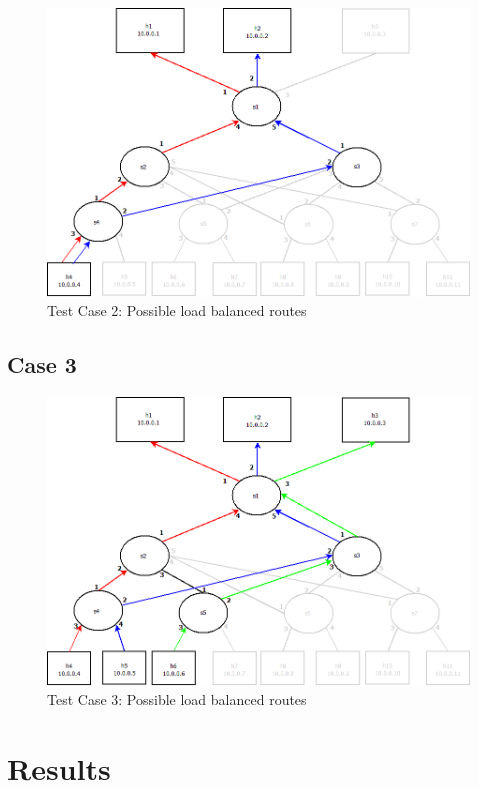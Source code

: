 \begin{figure}[h!]
 \includegraphics[width=\linewidth]{images/test2.png}
 \caption{Test Case 2: Possible load balanced routes}
 \label{fig:test2}
\end{figure}

\subsection{Case 3}
\lipsum[1-1]





\begin{figure}[h]
 \includegraphics[width=\linewidth]{images/test3.png}
 \caption{Test Case 3: Possible load balanced routes}
 \label{fig:test3}
\end{figure}

\section{Results}

